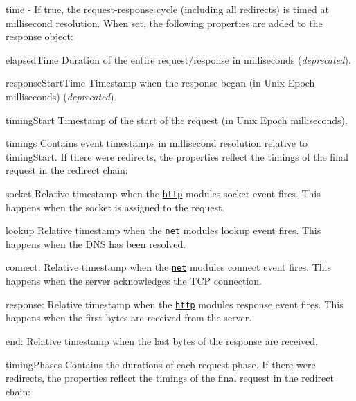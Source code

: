 \begin{DoxyItemize}
\item {\ttfamily time} -\/ If {\ttfamily true}, the request-\/response cycle (including all redirects) is timed at millisecond resolution. When set, the following properties are added to the response object\+:
\begin{DoxyItemize}
\item {\ttfamily elapsed\+Time} Duration of the entire request/response in milliseconds ({\itshape deprecated}).
\item {\ttfamily response\+Start\+Time} Timestamp when the response began (in Unix Epoch milliseconds) ({\itshape deprecated}).
\item {\ttfamily timing\+Start} Timestamp of the start of the request (in Unix Epoch milliseconds).
\item {\ttfamily timings} Contains event timestamps in millisecond resolution relative to {\ttfamily timing\+Start}. If there were redirects, the properties reflect the timings of the final request in the redirect chain\+:
\begin{DoxyItemize}
\item {\ttfamily socket} Relative timestamp when the \href{https://nodejs.org/api/http.html#http_event_socket}{\tt {\ttfamily http}} module\textquotesingle{}s {\ttfamily socket} event fires. This happens when the socket is assigned to the request.
\item {\ttfamily lookup} Relative timestamp when the \href{https://nodejs.org/api/net.html#net_event_lookup}{\tt {\ttfamily net}} module\textquotesingle{}s {\ttfamily lookup} event fires. This happens when the D\+NS has been resolved.
\item {\ttfamily connect}\+: Relative timestamp when the \href{https://nodejs.org/api/net.html#net_event_connect}{\tt {\ttfamily net}} module\textquotesingle{}s {\ttfamily connect} event fires. This happens when the server acknowledges the T\+CP connection.
\item {\ttfamily response}\+: Relative timestamp when the \href{https://nodejs.org/api/http.html#http_event_response}{\tt {\ttfamily http}} module\textquotesingle{}s {\ttfamily response} event fires. This happens when the first bytes are received from the server.
\item {\ttfamily end}\+: Relative timestamp when the last bytes of the response are received.
\end{DoxyItemize}
\item {\ttfamily timing\+Phases} Contains the durations of each request phase. If there were redirects, the properties reflect the timings of the final request in the redirect chain\+:

\end{DoxyItemize}
\end{DoxyItemize}
